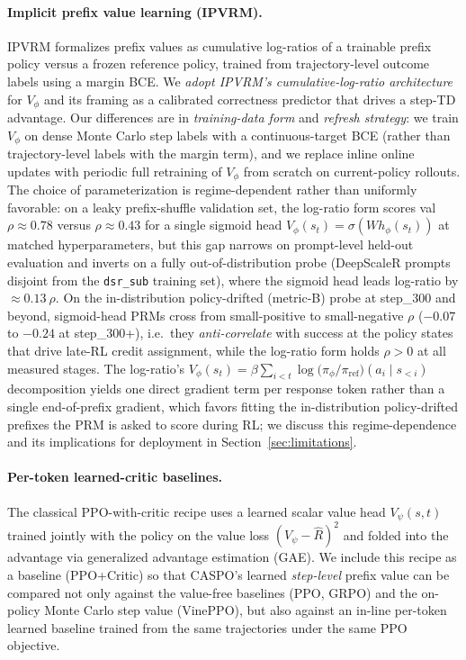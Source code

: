 \documentclass[11pt]{article}
\newcommand{\caspo}{\textsc{CASPO}}
\newcommand{\ppo}{PPO}
\newcommand{\ppocritic}{PPO+Critic}
\newcommand{\grpo}{GRPO}
\newcommand{\ipvrm}{IPVRM}
\newcommand{\vineppo}{VinePPO}
\begin{document}
\paragraph{Implicit prefix value learning (\ipvrm{}).}
\ipvrm{} \citep{ipvrm2026} formalizes prefix values as cumulative
log-ratios of a trainable prefix policy versus a frozen reference policy,
trained from trajectory-level outcome labels using a margin BCE. We
\emph{adopt \ipvrm{}'s cumulative-log-ratio architecture} for $V_\phi$
and its framing as a calibrated correctness predictor that drives a
step-TD advantage. Our differences are in \emph{training-data form} and
\emph{refresh strategy}: we train $V_\phi$ on dense Monte Carlo step
labels with a continuous-target BCE (rather than trajectory-level
labels with the margin term), and we replace inline online updates
with periodic full retraining of $V_\phi$ from scratch on current-policy
rollouts. The choice of parameterization is regime-dependent rather
than uniformly favorable: on a leaky prefix-shuffle validation set,
the log-ratio form scores val $\rho \approx 0.78$ versus $\rho
\approx 0.43$ for a single sigmoid head $V_\phi(s_t) = \sigma(W
h_\phi(s_t))$ at matched hyperparameters, but this gap narrows on
prompt-level held-out evaluation and inverts on a fully
out-of-distribution probe (DeepScaleR prompts disjoint from the
\texttt{dsr\_sub} training set), where the sigmoid head leads
log-ratio by ${\approx}0.13~\rho$. On the in-distribution
policy-drifted (metric-B) probe at step\_300 and beyond,
sigmoid-head PRMs cross from small-positive to small-negative
$\rho$ ($-0.07$ to $-0.24$ at step\_300+), i.e.\ they
\emph{anti-correlate} with success at the policy states that drive
late-RL credit assignment, while the log-ratio form holds
${\rho>0}$ at all measured stages. The log-ratio's
$V_\phi(s_t) = \beta \sum_{i<t} \log\!\big(\pi_\phi/\pi_{\mathrm{ref}}\big)(a_i \mid s_{<i})$
decomposition yields one direct gradient term per response token
rather than a single end-of-prefix gradient, which favors fitting
the in-distribution policy-drifted prefixes the PRM is asked to
score during RL; we discuss this regime-dependence and its
implications for deployment in Section~\ref{sec:limitations}.

\paragraph{Per-token learned-critic baselines.}
The classical PPO-with-critic recipe \citep{schulman2017ppo} uses a learned
scalar value head $V_\psi(s, t)$ trained jointly with the policy on the
value loss $(V_\psi - \hat R)^2$ and folded into the advantage via
generalized advantage estimation (GAE). We include this recipe as a baseline
(\ppocritic{}) so that \caspo{}'s learned \emph{step-level} prefix value can
be compared not only against the value-free baselines (\ppo{}, \grpo{}) and
the on-policy Monte Carlo step value (\vineppo{}), but also against an
in-line per-token learned baseline trained from the same trajectories under
the same PPO objective.
\end{document}
